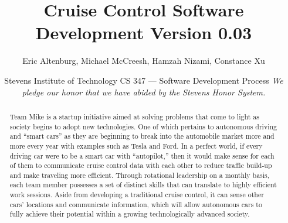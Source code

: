 \documentclass[preprint,11pt,3p]{article}
\title{Cruise Control Software Development Version 0.03}
\author{
Eric Altenburg, Michael McCreesh, Hamzah Nizami, Constance Xu}
\date{
	Stevens Institute of Technology\endgraf\bigskip
	CS 347 — Software Development Process\endgraf\bigskip
	\textit{We pledge our honor that we have abided by the Stevens Honor System.}}
\begin{document}
\maketitle
\newpage

\tableofcontents
\newpage

\begin{abstract}
	Team Mike is a startup initiative aimed at solving problems that come to light as
society begins to adopt new technologies. One of which pertains to autonomous
driving and “smart cars” as they are beginning to break into the automobile
market more and more every year with examples such as Tesla and Ford. In a
perfect world, if every driving car were to be a smart car with “autopilot,” then
it would make sense for each of them to communicate cruise control data with
each other to reduce traffic build-up and make traveling more efficient. Through
rotational leadership on a monthly basis, each team member possesses a set of
distinct skills that can translate to highly efficient work sessions. Aside from
developing a traditional cruise control, it can sense other cars’ locations and
communicate information, which will allow autonomous cars to fully achieve
their potential within a growing technologically advanced society.
\end{abstract}
\end{document}
